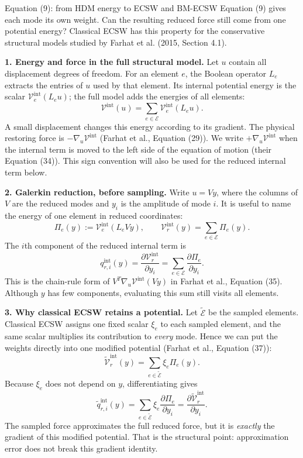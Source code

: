 \documentclass[a4paper,12pt]{article}
\begin{document}
\begin{lecturalarga}{Equation (9): from HDM energy to ECSW and BM-ECSW}
Equation (9) gives each mode its own weight. Can the resulting reduced force still come from one potential energy? Classical ECSW has this property for the conservative structural models studied by Farhat et al. (2015, Section 4.1).

\smallskip\textbf{1. Energy and force in the full structural model.} Let $u$ contain all displacement degrees of freedom. For an element $e$, the Boolean operator $L_e$ extracts the entries of $u$ used by that element. Its internal potential energy is the scalar $\mathcal V_e^{\mathrm{int}}(L_eu)$; the full model adds the energies of all elements:
\[
  \mathcal V^{\mathrm{int}}(u)
  =\sum_{e\in\mathcal E}\mathcal V_e^{\mathrm{int}}(L_eu).
\]
A small displacement changes this energy according to its gradient. The physical restoring force is $-\nabla_u\mathcal V^{\mathrm{int}}$ (Farhat et al., Equation (29)). We write $+\nabla_u\mathcal V^{\mathrm{int}}$ when the internal term is moved to the left side of the equation of motion (their Equation (34)). This sign convention will also be used for the reduced internal term below.

\smallskip\textbf{2. Galerkin reduction, before sampling.} Write $u=Vy$, where the columns of $V$ are the reduced modes and $y_i$ is the amplitude of mode $i$. It is useful to name the energy of one element in reduced coordinates:
\[
  \Pi_e(y):=\mathcal V_e^{\mathrm{int}}(L_eVy),
  \qquad
  \mathcal V_r^{\mathrm{int}}(y)=\sum_{e\in\mathcal E}\Pi_e(y).
\]
The $i$th component of the reduced internal term is
\[
  q_{r,i}^{\mathrm{int}}(y)
  =\frac{\partial\mathcal V_r^{\mathrm{int}}}{\partial y_i}
  =\sum_{e\in\mathcal E}\frac{\partial\Pi_e}{\partial y_i}.
\]
This is the chain-rule form of $V^T\nabla_u\mathcal V^{\mathrm{int}}(Vy)$ in Farhat et al., Equation (35). Although $y$ has few components, evaluating this sum still visits all elements.

\smallskip\textbf{3. Why classical ECSW retains a potential.} Let $\widetilde{\mathcal E}$ be the sampled elements. Classical ECSW assigns one fixed scalar $\xi_e$ to each sampled element, and the same scalar multiplies its contribution to \emph{every} mode. Hence we can put the weights directly into one modified potential (Farhat et al., Equation (37)):
\[
  \widetilde{\mathcal V}_r^{\mathrm{int}}(y)
  =\sum_{e\in\widetilde{\mathcal E}}\xi_e\Pi_e(y).
\]
Because $\xi_e$ does not depend on $y$, differentiating gives
\[
  \widetilde q_{r,i}^{\mathrm{int}}(y)
  =\sum_{e\in\widetilde{\mathcal E}}\xi_e
     \frac{\partial\Pi_e}{\partial y_i}
  =\frac{\partial\widetilde{\mathcal V}_r^{\mathrm{int}}}{\partial y_i}.
\]
The sampled force approximates the full reduced force, but it is \emph{exactly} the gradient of this modified potential. That is the structural point: approximation error does not break this gradient identity.


\end{lecturalarga}
\end{document}
